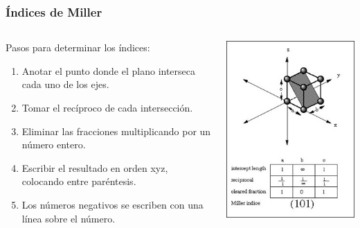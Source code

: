 \documentclass[10pt,t,aspectratio=169]{beamer}
\begin{document}
\begin{frame}[t]
  \frametitle{Índices de Miller}

  \begin{columns}
  
    \begin{column}{0.65\textwidth}
    
      Pasos para determinar los índices:

      \begin{enumerate}
        \item Anotar el punto donde el plano interseca cada uno de los ejes.
        \item Tomar el recíproco de cada intersección.
        \item Eliminar las fracciones multiplicando por un número entero.
        \item Escribir el resultado en orden xyz, colocando entre paréntesis.
        \item Los números negativos se escriben con una línea sobre el número.
      \end{enumerate}
      
    \end{column}
    
    \begin{column}{0.35\textwidth}
    
      \includegraphics[width=\textwidth]{./figures/miller101.jpg}
      

\end{column}
\end{columns}
\end{frame}
\end{document}
